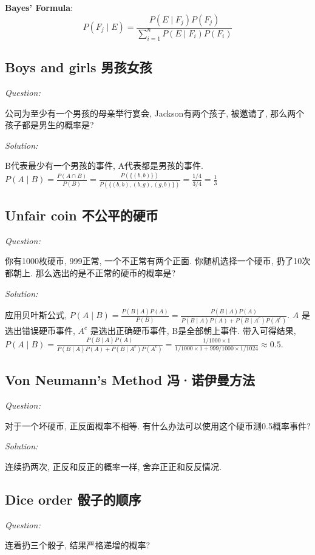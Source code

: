 \documentclass[12pt]{book}
\begin{document}
\textbf{Bayes' Formula}: $$P(F_j\mid E)=\frac{P(E\mid F_j)P(F_j)}{\sum_{i=1}^nP(E\mid F_i)P(F_i)}$$ 

   \subsection{Boys and girls 男孩女孩}
\noindent \textit{Question:}

公司为至少有一个男孩的母亲举行宴会, Jackson有两个孩子, 被邀请了, 那么两个孩子都是男生的概率是?

 \noindent \textit{Solution:} 
 
B代表最少有一个男孩的事件, A代表都是男孩的事件. $P(A\mid B)=\frac{P(A\cap B)}{P(B)}=\frac{P\left(\{(b,b)\}\right)}{P\left(\{(b,b),(b,g),(g,b)\}\right)}=\frac{1/4}{3/4}=\frac{1}{3}$ 

   \subsection{Unfair coin 不公平的硬币}
\noindent \textit{Question:}

你有1000枚硬币, 999正常, 一个不正常有两个正面. 你随机选择一个硬币, 扔了10次都朝上. 那么选出的是不正常的硬币的概率是?

 \noindent \textit{Solution:} 
 
 应用贝叶斯公式, $P(A\mid B)=\frac{P(B\mid A)P(A)}{P(B)}=\frac{P(B\mid A)P(A)}{P(B\mid A)P(A)+P(B\mid A^c)P(A^c)}$. $A$ 是选出错误硬币事件, $A^c$ 是选出正确硬币事件, B是全部朝上事件. 带入可得结果, $P(A\mid B)=\frac{P(B\mid A)P(A)}{P(B\mid A)P(A)+P(B\mid A^c)P(A^c)}=\frac{1/1000\times1}{1/1000\times1+999/1000\times1/1024}\approx0.5.$
 
    \subsection{Von Neumann’s Method 冯·诺伊曼方法}
\noindent \textit{Question:}
 
 对于一个坏硬币, 正反面概率不相等. 有什么办法可以使用这个硬币测0.5概率事件?
 
  \noindent \textit{Solution:} 
  
  连续扔两次, 正反和反正的概率一样, 舍弃正正和反反情况.
 
     \subsection{Dice order 骰子的顺序}
\noindent \textit{Question:}
 
 连着扔三个骰子, 结果严格递增的概率?
 
\end{document}

